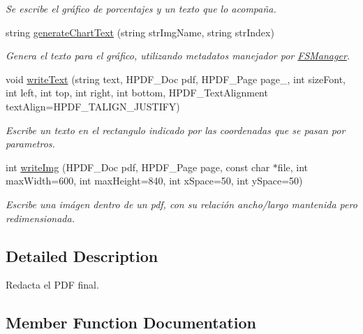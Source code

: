 \begin{DoxyCompactItemize}
\begin{DoxyCompactList}\small\item\em Se escribe el gráfico de porcentajes y un texto que lo acompaña. \end{DoxyCompactList}\item 
string \mbox{\hyperlink{classRedaction_a466ce7f7f8b2a4ec810b2da9c7832f26}{generate\+Chart\+Text}} (string str\+Img\+Name, string str\+Index)
\begin{DoxyCompactList}\small\item\em Genera el texto para el gráfico, utilizando metadatos manejador por \mbox{\hyperlink{classFSManager}{F\+S\+Manager}}. \end{DoxyCompactList}\item 
void \mbox{\hyperlink{classRedaction_ab5716b51790373ff2726286e1d02d73d}{write\+Text}} (string text, H\+P\+D\+F\+\_\+\+Doc pdf, H\+P\+D\+F\+\_\+\+Page page\+\_, int size\+Font, int left, int top, int right, int bottom, H\+P\+D\+F\+\_\+\+Text\+Alignment text\+Align=H\+P\+D\+F\+\_\+\+T\+A\+L\+I\+G\+N\+\_\+\+J\+U\+S\+T\+I\+FY)
\begin{DoxyCompactList}\small\item\em Escribe un texto en el rectangulo indicado por las coordenadas que se pasan por parametros. \end{DoxyCompactList}\item 
int \mbox{\hyperlink{classRedaction_a3236e2af6e29f073fa487056af998924}{write\+Img}} (H\+P\+D\+F\+\_\+\+Doc pdf, H\+P\+D\+F\+\_\+\+Page page, const char $\ast$file, int max\+Width=600, int max\+Height=840, int x\+Space=50, int y\+Space=50)
\begin{DoxyCompactList}\small\item\em Escribe una imágen dentro de un pdf, con su relación ancho/largo mantenida pero redimensionada. \end{DoxyCompactList}\end{DoxyCompactItemize}


\subsection{Detailed Description}
Redacta el P\+DF final. 

\subsection{Member Function Documentation}
\mbox{\label{classRedaction_a466ce7f7f8b2a4ec810b2da9c7832f26}} 
